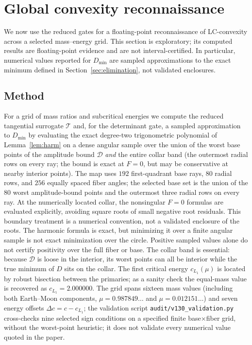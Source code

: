 \documentclass[11pt,reqno]{amsart}
\theoremstyle{plain}
\theoremstyle{definition}
\newcommand{\calT}{\mathcal{T}}
\newcommand{\calD}{\mathcal{D}}
\begin{document}
\section{Global convexity reconnaissance}\label{sec:map}

We now use the reduced gates for a floating-point reconnaissance of LC-convexity across a selected mass--energy grid. This section is exploratory; its computed results are floating-point evidence and are not interval-certified. In particular, numerical values reported for $D_{\min}$ are sampled approximations to the exact minimum defined in Section~\ref{sec:elimination}, not validated enclosures.

\subsection{Method}
For a grid of mass ratios and subcritical energies we compute the reduced tangential surrogate $\calT$ and, for the determinant gate, a sampled approximation to $D_{\min}$ by evaluating the exact degree-two trigonometric polynomial of Lemma~\ref{lem:harm} on a dense angular sample over the union of the worst base points of the amplitude bound $\calD$ \emph{and} the entire collar band (the outermost radial rows on every ray; the bound is exact at $F=0$, but may be conservative at nearby interior points). The map uses $192$ first-quadrant base rays, $80$ radial rows, and $256$ equally spaced fiber angles; the selected base set is the union of the $80$ worst amplitude-bound points and the outermost three radial rows on every ray. At the numerically located collar, the nonsingular $F=0$ formulas are evaluated explicitly, avoiding square roots of small negative root residuals. This boundary treatment is a numerical convention, not a validated enclosure of the roots. The harmonic formula is exact, but minimizing it over a finite angular sample is not exact minimization over the circle. Positive sampled values alone do not certify positivity over the full fiber or base. The collar band is essential: because $\calD$ is loose in the interior, its worst points can all be interior while the true minimum of $D$ sits on the collar. The first critical energy $c_{L_1}(\mu)$ is located by robust bisection between the primaries; as a sanity check the equal-mass value is recovered as $c_{L_1}=2.000000$. The grid spans sixteen mass values (including both Earth--Moon components, $\mu=0.987849\ldots$ and $\mu=0.012151\ldots$) and seven energy offsets $\Delta c=c-c_{L_1}$; the validation script \texttt{audit/v130\_validation.py} cross-checks nine selected sign conditions on a specified finite base$\times$fiber grid, without the worst-point heuristic; it does not validate every numerical value quoted in the paper.
\end{document}
